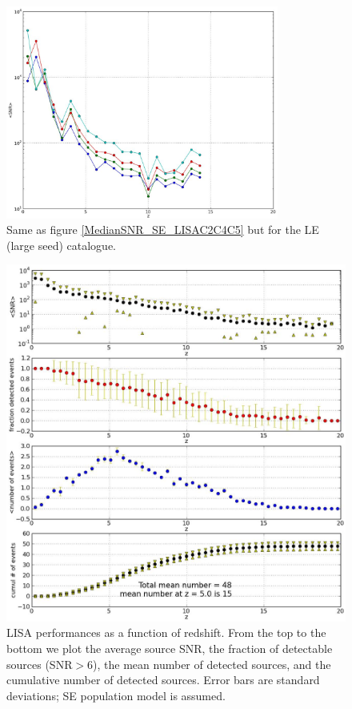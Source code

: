 \documentclass{iopart}
\begin{document}
\begin{figure}[H]
\center
   \includegraphics[width=0.8\textwidth]{FigSMBHPhenomAEI/MedianSNR_LE_LISAC2C4C5.eps}
\caption{Same as figure \ref{MedianSNR_SE_LISAC2C4C5} but for the LE (large seed) catalogue.
\label{MedianSNR_LE_LISAC2C4C5} } 
\end{figure}




\begin{figure}[H]
\center
   \includegraphics[width=1\textwidth]{FigSMBHPhenomAEI/LISA_mc_SNRs.eps}
\caption{LISA performances as a function of redshift. From the top to the bottom we plot the average source SNR, the fraction of detectable sources (SNR$>6$), the mean number of detected sources, and the cumulative number of detected sources. Error bars are standard deviations; SE population model is assumed.
\label{LISA_mc_SNR} } 
\end{figure}
\end{document}
